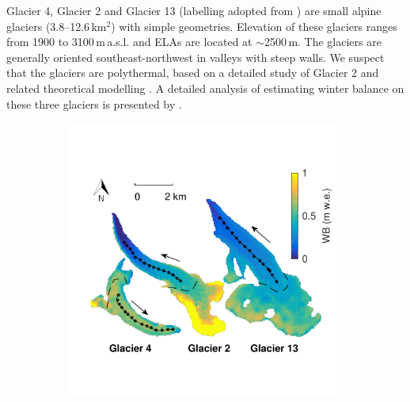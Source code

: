 \documentclass[twocolumn,letterpaper]{igs}
\begin{document}
Glacier 4, Glacier 2 and Glacier 13 (labelling adopted from \cite{Crompton2016}) are small alpine glaciers (3.8--12.6\,km$^2$) with simple geometries. Elevation of these glaciers ranges from 1900 to 3100\,m\,a.s.l. and ELAs are located at $\sim$2500\,m. The glaciers are generally oriented southeast-northwest in valleys with steep walls. We suspect that the glaciers are polythermal, based on a detailed study of Glacier 2 \citep{Wilson2013} and related theoretical modelling \citep{Wilson2013a}. A detailed analysis of estimating winter balance on these three glaciers is presented by \cite{Pulwicki2017}.



    \begin{figure}
        \centering
        \begin{subfigure}[b]{0.475\textwidth}
            \centering
            \includegraphics[width=\textwidth]{SampleDesign_Centreline.pdf}
            \caption[]{}    
        \end{subfigure}
        \hfill
        \begin{subfigure}[b]{0.475\textwidth}  
            \centering 

\end{subfigure}
\end{figure}
\end{document}
